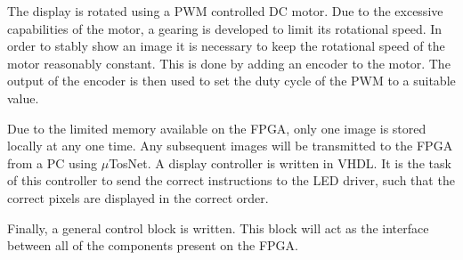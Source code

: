 The display is rotated using a PWM controlled DC motor.
Due to the excessive capabilities of the motor, a gearing is developed to limit its rotational speed.
In order to stably show an image it is necessary to keep the rotational speed of the motor reasonably constant.
This is done by adding an encoder to the motor.
The output of the encoder is then used to set the duty cycle of the PWM to a suitable value.

Due to the limited memory available on the FPGA, only one image is stored locally at any one time.
Any subsequent images will be transmitted to the FPGA from a PC using $\mu$TosNet.
A display controller is written in VHDL.
It is the task of this controller to send the correct instructions to the LED driver, such that the correct pixels are displayed in the correct order.

Finally, a general control block is written.
This block will act as the interface between all of the components present on the FPGA.
